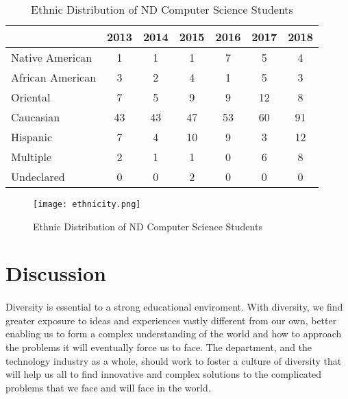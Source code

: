 \documentclass{article}
\begin{document}
	\begin{table}[H]
	
		\centering
		
		\caption{Ethnic Distribution of ND Computer Science Students}
		
		\label{tab:table2}
		
		\begin{tabular}{l||c c c c c c}
				
			 & 2013 & 2014 & 2015 & 2016 & 2017 & 2018\\
			
			\hline
				
			Native American & 1 & 1 & 1 & 7 & 5 & 4\\
            
            African American & 3 & 2 & 4 & 1 & 5 & 3\\
            
            Oriental & 7 & 5 & 9 & 9 & 12 & 8\\
            
            Caucasian & 43 & 43 & 47 & 53 & 60 & 91\\
            
            Hispanic & 7 & 4 & 10 & 9 & 3 & 12\\
            
            Multiple & 2 & 1 & 1 & 0 & 6 & 8\\
            
            Undeclared & 0 & 0 & 2 & 0 & 0 & 0\\ 
				
		\end{tabular}
			
	\end{table}
				
	\begin{figure}[H]
		\texttt{[image: ethnicity.png]}
		
		\caption{Ethnic Distribution of ND Computer Science Students}
		
		\label{fig:figure2}
		
	\end{figure}		
	
	\section{Discussion}
	
    \paragraph{}
    Diversity is essential to a strong educational enviroment. With diversity, we find greater exposure to ideas and experiences vastly different from our own, better enabling us to form a complex understanding of the world and how to approach the problems it will eventually force us to face. The department, and the technology industry as a whole, should work to foster a culture of diversity that will help us all to find innovative and complex solutions to the complicated problems that we face and will face in the world.
\end{document}
